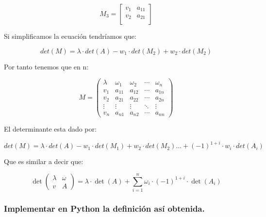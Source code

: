 \documentclass[11pt]{article}
\begin{document}
\begin{equation}
M_3 =
\begin{bmatrix}
v_1 & a_{11} \\
v_2 & a_{21} \\
\end{bmatrix}
\end{equation}

    Si simplificamos la ecuación tendríamos que:

\begin{equation}
det(M) =
\lambda \cdot
det(A)
-
w_1 \cdot det(M_2)
+
w_2 \cdot det(M_2)
\end{equation}

    Por tanto tenemos que en n:

\begin{equation}
M =
\begin{pmatrix}
\lambda & \omega_1 & \omega_2 & \cdots & \omega_n \\
v_1 & a_{11} & a_{12} & \cdots & a_{1n} \\
v_2 & a_{21} & a_{22} & \cdots & a_{2n} \\
\vdots & \vdots & \vdots & \ddots & \vdots \\
v_n & a_{n1} & a_{n2} & \cdots & a_{nn}
\end{pmatrix}
\end{equation}

El determinante esta dado por:

\begin{equation}
det(M) =
\lambda \cdot
det(A)
-
w_1 \cdot det(M_1)
+
w_2 \cdot det(M_2) ... + (-1)^{1+i} \cdot w_i \cdot det(A_i)
\end{equation}

Que es similar a decir que:

\begin{equation}
\det\begin{pmatrix}
\lambda & \omega \\
v & A
\end{pmatrix}
= \lambda \cdot \det(A) 
+
\sum_{i=1}^n \omega_i \cdot (-1)^{1+i} \cdot \det(A_i)
\end{equation}

    \subsubsection{Implementar en Python la definición así
obtenida.}\label{implementar-en-python-la-definiciuxf3n-asuxed-obtenida.}
\end{document}

